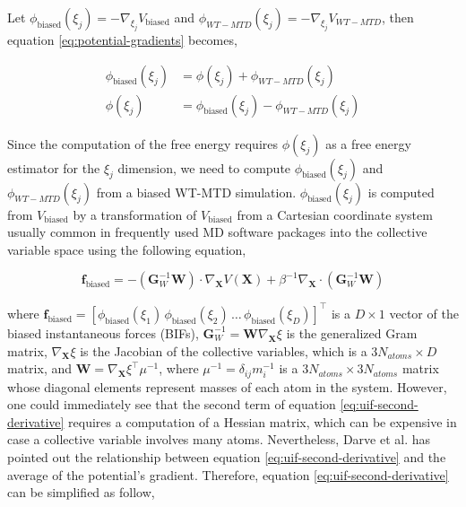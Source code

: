 \begin{spacing}{2.0}
    Let $\phi_{\mathrm{biased}}(\xi_j) = -\nabla_{\xi_j}V_{\mathrm{biased}}$ and $\phi_{WT-MTD}(\xi_j) = -\nabla_{\xi_j}V_{WT-MTD}$, then 
    equation \ref{eq:potential-gradients} becomes,

    \begin{equation}\begin{aligned}
        \phi_{\mathrm{biased}}(\xi_j) &= \phi(\xi_j) + \phi_{WT-MTD}(\xi_j) \\
        \phi(\xi_j) &= \phi_{\mathrm{biased}}(\xi_j) - \phi_{WT-MTD}(\xi_j)
    \end{aligned}\end{equation}

    Since the computation of the free energy requires $\phi(\xi_j)$ as a free energy estimator for the $\xi_j$ dimension, 
    we need to compute $\phi_{\mathrm{biased}}(\xi_j)$ and $\phi_{WT-MTD}(\xi_j)$ from a biased WT-MTD simulation. 
    $\phi_{\mathrm{biased}}(\xi_j)$ is computed from $V_{\mathrm{biased}}$ by a transformation of $V_{\mathrm{biased}}$
    from a Cartesian coordinate system usually common in frequently used MD software packages into the collective variable space using
    the following equation, \cite{B-FEComput}

    \begin{equation}
        \mathbf{f}_{\mathrm{biased}} = -(\mathbf{G}_W^{-1}\mathbf{W})\cdot\nabla_{\mathbf{X}}V(\mathbf{X}) + 
            \beta^{-1}\nabla_{\mathbf{X}}\cdot(\mathbf{G}^{-1}_W\mathbf{W})
        \label{eq:uif-second-derivative}
    \end{equation}

    \noindent where $\mathbf{f}_{\mathrm{biased}} = \left[\phi_{\mathrm{biased}}(\xi_1)\,\phi_{\mathrm{biased}}(\xi_2)\,
    \ldots\,\phi_{\mathrm{biased}}(\xi_D)\right]^{\top}$ is a $D\times 1$ vector of the biased instantaneous forces (BIFs), 
    $\mathbf{G}_W^{-1} = \mathbf{W}\nabla_{\mathbf{X}}\xi$ is the generalized Gram matrix, $\nabla_{\mathbf{X}}\xi$ is the Jacobian of the
    collective variables, which is a $3N_{atoms} \times D$ matrix, and $\mathbf{W} = \nabla_{\mathbf{X}}\xi^{\top}\mu^{-1}$, where 
    $\mu^{-1} = \delta_{ij}m_i^{-1}$ is a $3N_{atoms} \times 3N_{atoms}$ matrix whose diagonal elements represent masses of each atom
    in the system. However, one could immediately see that the second term of equation \ref{eq:uif-second-derivative} requires a computation of a 
    Hessian matrix, which can be expensive in case a collective variable involves many atoms. Nevertheless, Darve et al. has pointed out the 
    relationship between equation \ref{eq:uif-second-derivative} and the average of the potential’s gradient. 
    \cite{P-JChemPhys-2008-v128-Darve} Therefore, equation \ref{eq:uif-second-derivative} can be simplified as follow,


\end{spacing}
